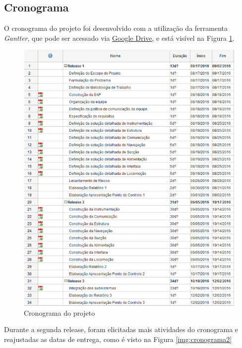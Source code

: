 	\subsection{Cronograma} %
	\label{sub:cronograma}
		
		O cronograma do projeto foi desenvolvido com a utilização da ferramenta \textit{Gantter}, que pode ser acessado via \href{https://www.smartapp.com/gantterforgoogledrive/index.html?fileID=0B7s5Po6PeeDMV2RhY2dWVEUtTUU#}{Google Drive}, e está visível na Figura \ref{img:cronograma1}.

		\begin{figure}[H]
			\centering
			\includegraphics[scale=0.8]{figuras/cronograma.png}
			\caption{Cronograma do projeto}
			\label{img:cronograma1}
		\end{figure}

		Durante a segunda release, foram elicitadas mais atividades do cronograma e reajustadas as datas de entrega, como é visto na Figura \ref{img:cronograma2}

